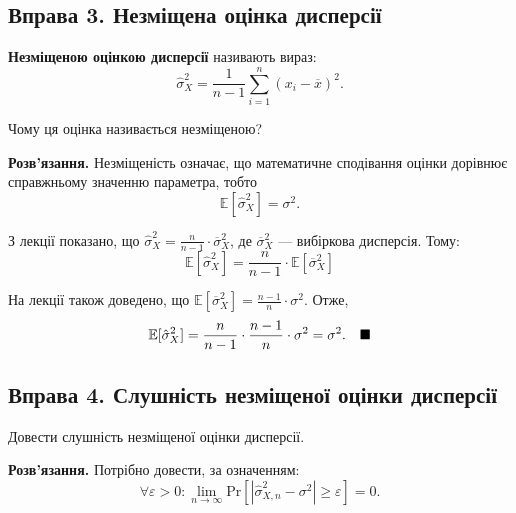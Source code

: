 \documentclass{hw_template}
\begin{document}
\pagebreak

\subsection{Вправа 3. Незміщена оцінка дисперсії}

\begin{problem}
    \textbf{Незміщеною оцінкою дисперсії} називають вираз:
    \begin{equation*}
        \hat{\sigma}_X^2 = \frac{1}{n-1}\sum_{i=1}^n (x_i - \overline{x})^2.
    \end{equation*}

    Чому ця оцінка називається незміщеною?
\end{problem}

\textbf{Розв'язання.} Незміщеність означає, що математичне сподівання оцінки дорівнює справжньому значенню параметра, тобто
\begin{equation*}
    \mathbb{E}[\hat{\sigma}_X^2] = \sigma^2.
\end{equation*}

З лекції показано, що $\hat{\sigma}_X^2 = \frac{n}{n-1} \cdot \overline{\sigma}_X^2$, де $\overline{\sigma}_X^2$ --- вибіркова дисперсія. Тому:
\begin{equation*}
    \mathbb{E}[\hat{\sigma}_X^2] = \frac{n}{n-1} \cdot \mathbb{E}[\overline{\sigma}_X^2]
\end{equation*}

На лекції також доведено, що $\mathbb{E}[\overline{\sigma}_X^2] = \frac{n-1}{n} \cdot \sigma^2$. Отже, 
\begin{equation*}
    \mathbb{E}[\hat{\sigma}_X^2] = \frac{n}{n-1} \cdot \frac{n-1}{n} \cdot \sigma^2 = \sigma^2. \quad \hfill \blacksquare
\end{equation*}

\pagebreak

\subsection{Вправа 4. Слушність незміщеної оцінки дисперсії}

\begin{problem}
    Довести слушність незміщеної оцінки дисперсії.
\end{problem}

\textbf{Розв'язання.} Потрібно довести, за означенням:
\begin{equation*}
    \forall \varepsilon > 0: \lim_{n \to \infty}\text{Pr}[|\hat{\sigma}_{X,n}^2 - \sigma^2| \geq \varepsilon] = 0.
\end{equation*}
\end{document}
